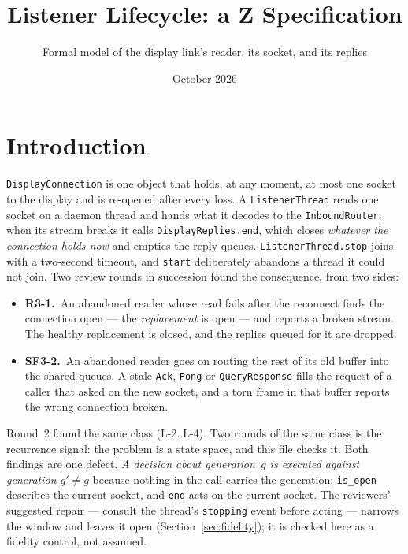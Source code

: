 \documentclass[a4paper,10pt,fleqn]{article}
\begin{document}
\title{Listener Lifecycle: a Z Specification}
\author{Formal model of the display link's reader, its socket, and its replies}
\date{October 2026}
\maketitle

\section{Introduction}

\texttt{DisplayConnection} is one object that holds, at any moment, at most
one socket to the display and is re-opened after every loss.  A
\texttt{ListenerThread} reads one socket on a daemon thread and hands what it
decodes to the \texttt{InboundRouter}; when its stream breaks it calls
\texttt{DisplayReplies.end}, which closes \emph{whatever the connection holds
now} and empties the reply queues.  \texttt{ListenerThread.stop} joins with a
two-second timeout, and \texttt{start} deliberately abandons a thread it could
not join.  Two review rounds in succession found the consequence, from two
sides:

\begin{itemize}
  \item \textbf{R3-1.}\ An abandoned reader whose read fails after the
    reconnect finds the connection open --- the \emph{replacement} is open ---
    and reports a broken stream.  The healthy replacement is closed, and the
    replies queued for it are dropped.
  \item \textbf{SF3-2.}\ An abandoned reader goes on routing the rest of its
    old buffer into the shared queues.  A stale \texttt{Ack},
    \texttt{Pong} or \texttt{QueryResponse} fills the request of a caller that
    asked on the new socket, and a torn frame in that buffer reports the wrong
    connection broken.
\end{itemize}

Round~2 found the same class (L-2..L-4).  Two rounds of the same class is the
recurrence signal: the problem is a state space, and this file checks it.
Both findings are one defect.  \emph{A decision about generation~$g$ is
executed against generation $g' \ne g$} because nothing in the call carries
the generation: \texttt{is\_open} describes the current socket, and
\texttt{end} acts on the current socket.  The reviewers' suggested repair ---
consult the thread's \texttt{stopping} event before acting --- narrows the
window and leaves it open (Section~\ref{sec:fidelity}); it is checked here as
a fidelity control, not assumed.
\end{document}
